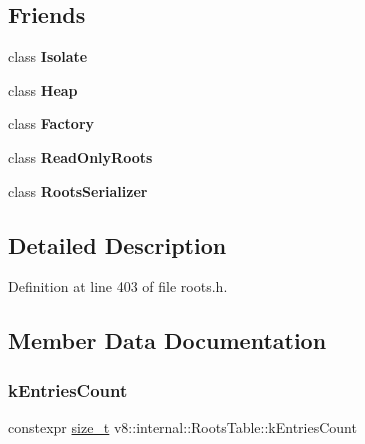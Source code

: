 \subsection*{Friends}
\begin{DoxyCompactItemize}
\item 
\mbox{\label{classv8_1_1internal_1_1RootsTable_aba4f0964bdacf2bbf62cf876e5d28d0a}} 
class {\bfseries Isolate}
\item 
\mbox{\label{classv8_1_1internal_1_1RootsTable_a3d69975be2e998e7bf2dcd1b1c8b4577}} 
class {\bfseries Heap}
\item 
\mbox{\label{classv8_1_1internal_1_1RootsTable_a328c093d609680cca505905c6d49901a}} 
class {\bfseries Factory}
\item 
\mbox{\label{classv8_1_1internal_1_1RootsTable_a723b2cfa707c63382946bbf0be13d9ec}} 
class {\bfseries Read\+Only\+Roots}
\item 
\mbox{\label{classv8_1_1internal_1_1RootsTable_a8d9995d9772cd856872506697a71691d}} 
class {\bfseries Roots\+Serializer}
\end{DoxyCompactItemize}


\subsection{Detailed Description}


Definition at line 403 of file roots.\+h.



\subsection{Member Data Documentation}
\mbox{\label{classv8_1_1internal_1_1RootsTable_a441891bb0367b9c60179d1b0ebb48354}} 
\subsubsection{\texorpdfstring{k\+Entries\+Count}{kEntriesCount}}
{\footnotesize\ttfamily constexpr \mbox{\hyperlink{classsize__t}{size\+\_\+t}} v8\+::internal\+::\+Roots\+Table\+::k\+Entries\+Count\hspace{0.3cm}{\ttfamily [static]}}

